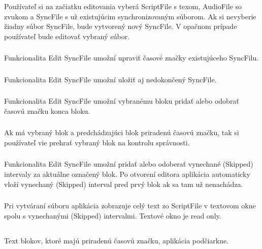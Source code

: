 \documentclass{article}
\begin{document}
\subsubsection{}
Používateľ si na začiatku editovania vyberá ScriptFile s texom, AudioFile so zvukom a SyncFile s už existujúcim synchronizovaným súborom. Ak si nevyberie žiadny súbor SyncFile, bude vytvorený nový SyncFile. V opačnom prípade používateľ bude editovať vybraný súbor.

\subsubsection{}
Funkcionalita Edit SyncFile umožní upraviť časové značky existujúceho SyncFilu.

\subsubsection{}
Funkcionalita Edit SyncFile umožní uložiť aj nedokončený SyncFile.

\subsubsection{}
Funkcionalita Edit SyncFile umožní vybranému bloku pridať alebo odobrať časovú značku konca bloku. 

\subsubsection{}
Ak má vybraný blok a predchádzajúci blok priradenú časovú značku, tak si používateľ vie prehrať vybraný blok na kontrolu správnosti.

\subsubsection{}
Funkcionalita Edit SyncFile umožní pridať alebo odoberať vynechané (Skipped) intervaly za aktuálne označený blok. Po otvorení editora aplikácia automaticky vloží vynechaný (Skipped) interval pred prvý blok ak sa tam už nenachádza.

\subsubsection{}
Pri vytváraní súboru aplikácia zobrazuje celý text zo ScriptFile v textovom okne spolu s vynechanými (Skipped) intervalmi. Textové okno je read only.

\subsection{}
Text blokov, ktoré majú priradenú časovú značku, aplikácia podčiarkne. 
\end{document}
